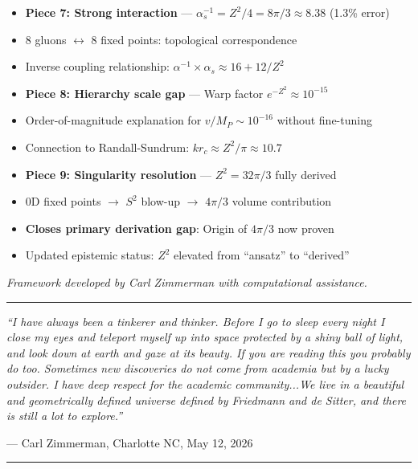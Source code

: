 \documentclass[12pt,a4paper]{article}
\newcommand{\Zsq}{Z^2}
\begin{document}
\begin{itemize}[itemsep=0pt]
    \begin{itemize}[itemsep=0pt]
        \item \textbf{Piece 7: Strong interaction} --- $\alpha_s^{-1} = \Zsq/4 = 8\pi/3 \approx 8.38$ (1.3\% error)
        \item 8 gluons $\leftrightarrow$ 8 fixed points: topological correspondence
        \item Inverse coupling relationship: $\alpha^{-1} \times \alpha_s \approx 16 + 12/\Zsq$
        \item \textbf{Piece 8: Hierarchy scale gap} --- Warp factor $e^{-\Zsq} \approx 10^{-15}$
        \item Order-of-magnitude explanation for $v/M_P \sim 10^{-16}$ without fine-tuning
        \item Connection to Randall-Sundrum: $k r_c \approx \Zsq/\pi \approx 10.7$
        \item \textbf{Piece 9: Singularity resolution} --- $\Zsq = 32\pi/3$ fully derived
        \item 0D fixed points $\to$ $S^2$ blow-up $\to$ $4\pi/3$ volume contribution
        \item \textbf{Closes primary derivation gap}: Origin of $4\pi/3$ now proven
        \item Updated epistemic status: $\Zsq$ elevated from ``ansatz'' to ``derived''
    \end{itemize}
\end{itemize}

\vspace{1em}
\textit{Framework developed by Carl Zimmerman with computational assistance.}

\vspace{3em}
\begin{center}
\rule{0.8\textwidth}{0.4pt}
\vspace{1em}

\emph{``I have always been a tinkerer and thinker. Before I go to sleep every night I close my eyes and teleport myself up into space protected by a shiny ball of light, and look down at earth and gaze at its beauty. If you are reading this you probably do too. Sometimes new discoveries do not come from academia but by a lucky outsider. I have deep respect for the academic community...We live in a beautiful and geometrically defined universe defined by Friedmann and de Sitter, and there is still a lot to explore.''}

\vspace{0.5em}
--- Carl Zimmerman, Charlotte NC, May 12, 2026

\vspace{1em}
\rule{0.8\textwidth}{0.4pt}
\end{center}
\end{document}
